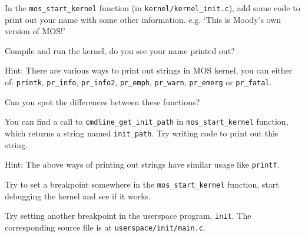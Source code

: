 \begin{exercise}
    \item In the \texttt{mos\_start\_kernel} function (in \texttt{kernel/kernel\_init.c}), add some code
    to print out your name with some other information. e.g. `This is Moody's own version of MOS!'

    Compile and run the kernel, do you see your name printed out?

    \begin{mdframed}
        Hint: There are various ways to print out strings in MOS kernel, you can either of:
        \texttt{printk}, \texttt{pr\_info}, \texttt{pr\_info2}, \texttt{pr\_emph}, \texttt{pr\_warn},
        \texttt{pr\_emerg} or \texttt{pr\_fatal}.
    \end{mdframed}

    Can you spot the differences between these functions?

    \item You can find a call to \texttt{cmdline\_get\_init\_path} in \texttt{mos\_start\_kernel} function,
    which returns a string named \texttt{init\_path}. Try writing code to print out this string.

    \begin{mdframed}
        Hint: The above ways of printing out strings have similar usage like \texttt{printf}.
    \end{mdframed}

    \item Try to set a breakpoint somewhere in the \texttt{mos\_start\_kernel} function, start debugging
    the kernel and see if it works.

    \item Try setting another breakpoint in the userspace program, \texttt{init}. The corresponding
    source file is at \texttt{userspace/init/main.c}.
\end{exercise}

